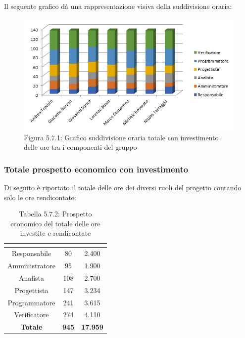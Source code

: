 Il seguente grafico dà una rappresentazione visiva della suddivisione oraria: \\
\begin{figure} [H]
	\centering
	\includegraphics[scale=1]{Res/ExcelGrafici/Grafici/InvestimentoOre.png}
	\caption{Figura 5.7.1: Grafico suddivisione oraria totale con investimento delle ore tra i componenti del gruppo}\label{}
\end{figure}

\subsubsection{Totale prospetto economico con investimento}
Di seguito è riportato il totale delle ore dei diversi ruoli del progetto contando solo le ore rendicontate:

\renewcommand{\arraystretch}{1.5}
\begin{table}[H]
\begin{center}
\begin{tabular}{|c|c|c|}
\hline
\rowcolor{title_row}
\textbf{\color{title_text}{Ruolo}}  & \textbf{\color{title_text}{Ore}} & \textbf{\color{title_text}{Costo in \euro}} \\ \hline
Responsabile    & 80 & 2.400 \\ \hline
Amministratore  & 95 & 1.900 \\ \hline
Analista        & 108 & 2.700 \\ \hline
Progettista     & 147 & 3.234 \\ \hline
Programmatore   & 241 & 3.615 \\ \hline
Verificatore    & 274 & 4.110 \\ \hline
\textbf{Totale} & \textbf{945}    & \textbf{17.959}           \\ \hline
\end{tabular}
\caption{Tabella 5.7.2: Prospetto economico del totale delle ore investite e rendicontate \label{}}
\end{center}
\end{table}
\renewcommand{\arraystretch}{1}

